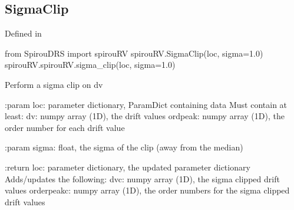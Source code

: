 \noindent\begin{minipage}{\textwidth}
\subsection{SigmaClip}

Defined in \spirouRV{}

\begin{pythonbox}
from SpirouDRS import spirouRV
spirouRV.SigmaClip(loc, sigma=1.0)
spirouRV.spirouRV.sigma_clip(loc, sigma=1.0)
\end{pythonbox}

\begin{pythondocstring}
Perform a sigma clip on dv

:param loc: parameter dictionary, ParamDict containing data
        Must contain at least:
            dv: numpy array (1D), the drift values
            ordpeak: numpy array (1D), the order number for each drift
                     value

:param sigma: float, the sigma of the clip (away from the median)

:return loc: parameter dictionary, the updated parameter dictionary
        Adds/updates the following:
            dvc: numpy array (1D), the sigma clipped drift values
            orderpeakc: numpy array (1D), the order numbers for the sigma
                        clipped drift values
\end{pythondocstring}
\end{minipage}

